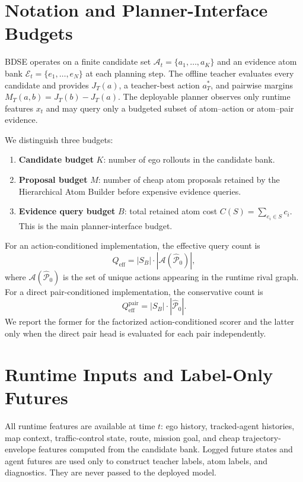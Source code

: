 \documentclass{article}
\newcommand{\A}{\mathcal{A}}
\newcommand{\E}{\mathcal{E}}
\begin{document}
\appendix

\section{Notation and Planner-Interface Budgets}
\label{app:notation}

BDSE operates on a finite candidate set $\A_t=\{a_1,\ldots,a_K\}$ and an evidence atom bank $\E_t=\{e_1,\ldots,e_N\}$ at each planning step. The offline teacher evaluates every candidate and provides $J_T(a)$, a teacher-best action $a_T^*$, and pairwise margins $M_T(a,b)=J_T(b)-J_T(a)$. The deployable planner observes only runtime features $x_t$ and may query only a budgeted subset of atom--action or atom--pair evidence.

We distinguish three budgets:
\begin{enumerate}[leftmargin=*]
    \item \textbf{Candidate budget} $K$: number of ego rollouts in the candidate bank.
    \item \textbf{Proposal budget} $M$: number of cheap atom proposals retained by the Hierarchical Atom Builder before expensive evidence queries.
    \item \textbf{Evidence query budget} $B$: total retained atom cost $C(S)=\sum_{e_i\in S}c_i$. This is the main planner-interface budget.
\end{enumerate}
For an action-conditioned implementation, the effective query count is
\begin{equation}
    Q_{\mathrm{eff}}=|S_B|\cdot |\A(\widehat{\mathcal P}_0)|,
\end{equation}
where $\A(\widehat{\mathcal P}_0)$ is the set of unique actions appearing in the runtime rival graph. For a direct pair-conditioned implementation, the conservative count is
\begin{equation}
    Q_{\mathrm{eff}}^{\mathrm{pair}}=|S_B|\cdot |\widehat{\mathcal P}_0|.
\end{equation}
We report the former for the factorized action-conditioned scorer and the latter only when the direct pair head is evaluated for each pair independently.

\section{Runtime Inputs and Label-Only Futures}
\label{app:runtime_inputs}

All runtime features are available at time $t$: ego history, tracked-agent histories, map context, traffic-control state, route, mission goal, and cheap trajectory-envelope features computed from the candidate bank. Logged future states and agent futures are used only to construct teacher labels, atom labels, and diagnostics. They are never passed to the deployed model.
\end{document}
